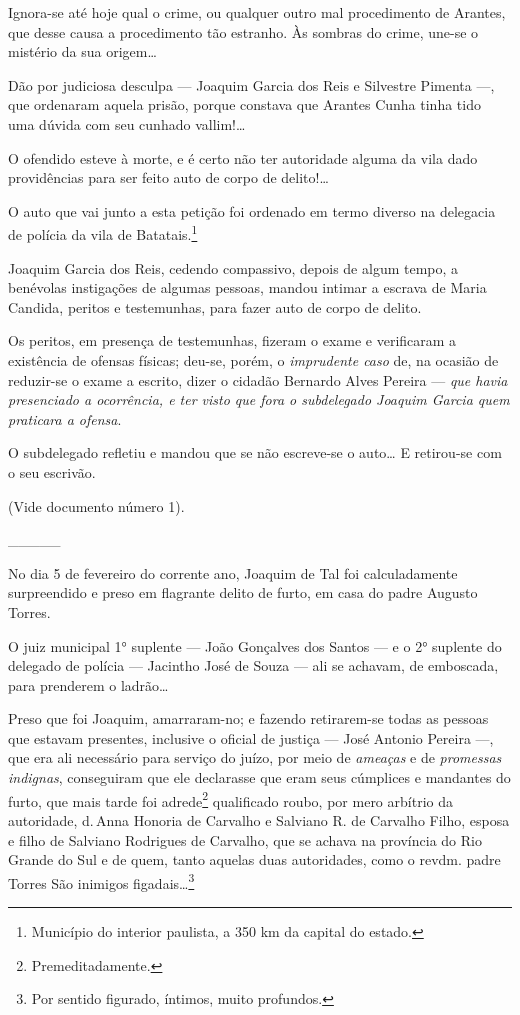 Ignora-se até hoje qual o crime, ou qualquer outro mal procedimento de
Arantes, que desse causa a procedimento tão estranho. Às sombras do
crime, une-se o mistério da sua origem\ldots{}

Dão por judiciosa desculpa --- Joaquim Garcia dos Reis e Silvestre
Pimenta ---, que ordenaram aquela prisão, porque constava que Arantes
Cunha tinha tido uma dúvida com seu cunhado vallim!\ldots{}

O ofendido esteve à morte, e é certo não ter autoridade alguma da vila
dado providências para ser feito auto de corpo de delito!\ldots{}

O auto que vai junto a esta petição foi ordenado em termo diverso na
delegacia de polícia da vila de Batatais.\footnote{ Município do
  interior paulista, a 350 km da capital do estado.}

Joaquim Garcia dos Reis, cedendo compassivo, depois de algum tempo, a
benévolas instigações de algumas pessoas, mandou intimar a escrava de
Maria Candida, peritos e testemunhas, para fazer auto de corpo de
delito.

Os peritos, em presença de testemunhas, fizeram o exame e verificaram a
existência de ofensas físicas; deu-se, porém, o \emph{imprudente caso}
de, na ocasião de reduzir-se o exame a escrito, dizer o cidadão Bernardo
Alves Pereira --- \emph{que havia presenciado a ocorrência, e ter visto
que fora o subdelegado Joaquim Garcia quem praticara a ofensa}.

O subdelegado refletiu e mandou que se não escreve-se o auto\ldots{} E
retirou-se com o seu escrivão.

(Vide documento número 1).

\_\_\_\_\_

No dia 5 de fevereiro do corrente ano, Joaquim de Tal foi calculadamente
surpreendido e preso em flagrante delito de furto, em casa do padre
Augusto Torres.

O juiz municipal 1° suplente --- João Gonçalves dos Santos --- e o 2°
suplente do delegado de polícia --- Jacintho José de Souza --- ali se
achavam, de emboscada, para prenderem o ladrão\ldots{}

Preso que foi Joaquim, amarraram-no; e fazendo retirarem-se todas as
pessoas que estavam presentes, inclusive o oficial de justiça --- José
Antonio Pereira ---, que era ali necessário para serviço do juízo, por
meio de \emph{ameaças} e de \emph{promessas indignas}, conseguiram que
ele declarasse que eram seus cúmplices e mandantes do furto, que mais
tarde foi adrede\footnote{ Premeditadamente.} qualificado roubo, por
mero arbítrio da autoridade, d.\,Anna Honoria de Carvalho e Salviano R.
de Carvalho Filho, esposa e filho de Salviano Rodrigues de Carvalho, que
se achava na província do Rio Grande do Sul e de quem, tanto aquelas
duas autoridades, como o revdm. padre Torres São inimigos
figadais\ldots{}\footnote{ Por sentido figurado, íntimos, muito profundos.}


